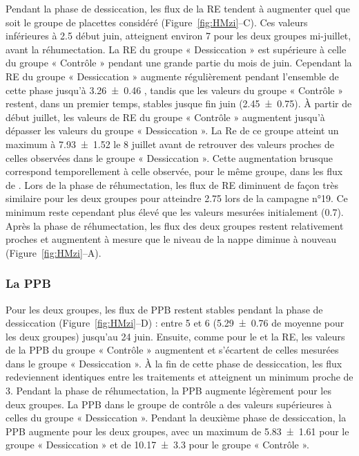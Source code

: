 Pendant la phase de dessiccation, les flux de la RE tendent à augmenter quel que soit le groupe de placettes considéré (Figure~\ref{fig:HMzi}--C).
Ces valeurs inférieures à \SI{2.5}{\uml} début juin, atteignent environ \SI{7}{\uml} pour les deux groupes mi-juillet, avant la réhumectation.
La RE du groupe « Dessiccation » est supérieure à celle du groupe « Contrôle » pendant une grande partie du mois de juin.
Cependant la RE du groupe « Dessiccation » augmente régulièrement pendant l'ensemble de cette phase jusqu'à \SI{3.26(046)}{\uml} , tandis que les valeurs du groupe « Contrôle » restent, dans un premier temps, stables jusque fin juin (\SI{2.45(075)}{\uml}).
À partir de début juillet, les valeurs de RE du groupe « Contrôle » augmentent jusqu'à dépasser les valeurs du groupe « Dessiccation ».
La Re de ce groupe atteint un maximum à \SI{7.93(152)}{\uml} le 8 juillet avant de retrouver des valeurs proches de celles observées dans le groupe « Dessiccation ».
Cette augmentation brusque correspond temporellement à celle observée, pour le même groupe, dans les flux de \chh.
Lors de la phase de réhumectation, les flux de RE diminuent de façon très similaire pour les deux groupes pour atteindre \SI{2.75}{\uml} lors de la campagne n°19.
Ce minimum reste cependant plus élevé que les valeurs mesurées initialement (\SI{0.7}{\uml}).
Après la phase de réhumectation, les flux des deux groupes restent relativement proches et augmentent à mesure que le niveau de la nappe diminue à nouveau (Figure~\ref{fig:HMzi}--A).

\subsubsection{La PPB}

Pour les deux groupes, les flux de PPB restent stables pendant la phase de dessiccation (Figure~\ref{fig:HMzi}--D) :
entre 5 et \SI{6}{\uml} (\SI{5.29(076)}{\uml} de moyenne pour les deux groupes) jusqu'au 24 juin.
Ensuite, comme pour le \chh et la RE, les valeurs de la PPB du groupe « Contrôle » augmentent et s'écartent de celles mesurées dans le groupe « Dessiccation ».
À la fin de cette phase de dessiccation, les flux redeviennent identiques entre les traitements et atteignent un minimum proche de \SI{3}{\uml}.
Pendant la phase de réhumectation, la PPB augmente légèrement pour les deux groupes.
La PPB dans le groupe de contrôle a des valeurs supérieures à celles du groupe « Dessiccation ».
Pendant la deuxième phase de dessiccation, la PPB augmente pour les deux groupes, avec un maximum de \SI{5.83(161)}{\uml} pour le groupe « Dessiccation » et de \SI{10.17(330)}{\uml} pour le groupe « Contrôle ».

